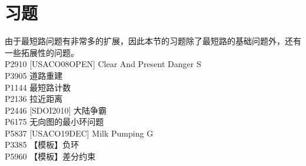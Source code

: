 \documentclass{beamer}
\begin{document}
\section{习题}
\begin{frame}
由于最短路问题有非常多的扩展，因此本节的习题除了最短路的基础问题外，还有一些拓展性的问题。\\ 
P2910	[USACO08OPEN] Clear And Present Danger S\\ 
P3905	道路重建\\ 
P1144	最短路计数\\ 
P2136 拉近距离 \\
P2446	[SDOI2010] 大陆争霸 \\
P6175	无向图的最小环问题 \\
P5837	[USACO19DEC] Milk Pumping G\\ 
P3385	【模板】负环 \\ 
P5960	【模板】差分约束
\end{frame}
\end{document}
